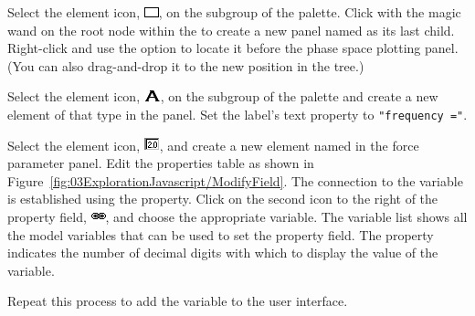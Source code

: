 \begin{bulletlist}

\item Select the  element icon, \includegraphics[scale=\linescale]{../_common/icons_png/Elements/Panel.png}, on the  subgroup of the  palette. Click with the magic wand on the  root node within the  to create a new panel named  as its last child. Right-click and use the  option to locate it before the phase space plotting panel. (You can also drag-and-drop it to the new position in the tree.) 
\item Select the  element icon, \includegraphics[scale=\linescale]{../_common/icons_png/Elements/Label.png}, on the  subgroup of the  palette and create a new element of that type in the  panel.  Set the label's text property to \texttt{"frequency ="}.
\item Select the  element icon, \includegraphics[scale=\linescale]{../_common/icons_png/Elements/ParsedField.png}, and create a new element named  in the force parameter panel.  Edit the  properties table as shown in Figure~\ref{fig:03ExplorationJavascript/ModifyField}. The connection to the  variable is established using the  property.  Click on the second icon to the right of the property field, \includegraphics[scale=\linescale]{../_common/icons_png/link.png}, and choose the appropriate variable. The variable list shows all the model variables that can be used to set the property field. The  property indicates the number of decimal digits with which to display the value of the variable.
\item Repeat this process to add the  variable to the user interface.
\end{bulletlist}

